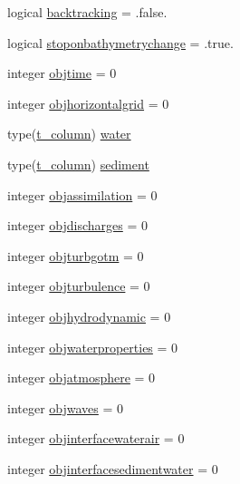 \begin{DoxyCompactItemize}
\item 
logical \mbox{\hyperlink{structmodulemodel_1_1t__model_aff034f47ca46649bb72f4b7694b23378}{backtracking}} = .false.
\item 
logical \mbox{\hyperlink{structmodulemodel_1_1t__model_a7c9b5aae261e34e308ac22a2386ba979}{stoponbathymetrychange}} = .true.
\item 
integer \mbox{\hyperlink{structmodulemodel_1_1t__model_a6632233770ba32536cb20e906df294c8}{objtime}} = 0
\item 
integer \mbox{\hyperlink{structmodulemodel_1_1t__model_ad3943d002ddee34f98d1965c13fbf628}{objhorizontalgrid}} = 0
\item 
type(\mbox{\hyperlink{structmodulemodel_1_1t__column}{t\+\_\+column}}) \mbox{\hyperlink{structmodulemodel_1_1t__model_a59d87987e7ffbeb5b46799cb162e0e80}{water}}
\item 
type(\mbox{\hyperlink{structmodulemodel_1_1t__column}{t\+\_\+column}}) \mbox{\hyperlink{structmodulemodel_1_1t__model_a13aca7ba3f2863f1a945c58c151260fd}{sediment}}
\item 
integer \mbox{\hyperlink{structmodulemodel_1_1t__model_aded43097bf950365c70c660cc72f518d}{objassimilation}} = 0
\item 
integer \mbox{\hyperlink{structmodulemodel_1_1t__model_a6328f91577aca2cf015e71cd07b33c81}{objdischarges}} = 0
\item 
integer \mbox{\hyperlink{structmodulemodel_1_1t__model_a355ca10d7790e5ecb6f5e38a1af77ad0}{objturbgotm}} = 0
\item 
integer \mbox{\hyperlink{structmodulemodel_1_1t__model_accd00655f7089c1c45388781155e7d1a}{objturbulence}} = 0
\item 
integer \mbox{\hyperlink{structmodulemodel_1_1t__model_a83f972012c1d04a2aca9dda3eccfefc3}{objhydrodynamic}} = 0
\item 
integer \mbox{\hyperlink{structmodulemodel_1_1t__model_acafb0b382a6a07b2adcf801329ffb039}{objwaterproperties}} = 0
\item 
integer \mbox{\hyperlink{structmodulemodel_1_1t__model_a5eb04ed7cc062e2801de782128f91162}{objatmosphere}} = 0
\item 
integer \mbox{\hyperlink{structmodulemodel_1_1t__model_afb34f54fc6d2d6589a061c302702f9b5}{objwaves}} = 0
\item 
integer \mbox{\hyperlink{structmodulemodel_1_1t__model_a1b8709231189d6bda738513f26327a56}{objinterfacewaterair}} = 0
\item 
integer \mbox{\hyperlink{structmodulemodel_1_1t__model_a78d2967b5446ad1eec269ab5a11e8af6}{objinterfacesedimentwater}} = 0

\end{DoxyCompactItemize}
